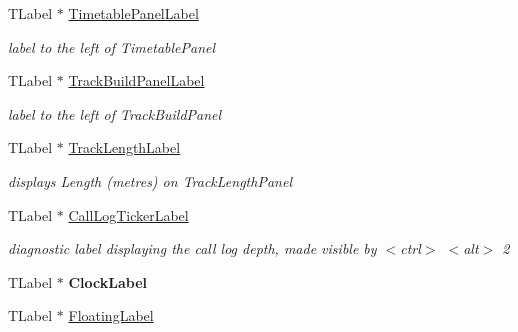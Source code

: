 \begin{DoxyCompactItemize}
\mbox{\label{class_t_interface_a321b10bd4ed20c62fa41fe6b950cb3b0}} 
T\+Label $\ast$ \mbox{\hyperlink{class_t_interface_a321b10bd4ed20c62fa41fe6b950cb3b0}{Timetable\+Panel\+Label}}
\begin{DoxyCompactList}\small\item\em label to the left of Timetable\+Panel \end{DoxyCompactList}\item 
\mbox{\label{class_t_interface_afbeb8c812aebd7b45f09b09889281a4c}} 
T\+Label $\ast$ \mbox{\hyperlink{class_t_interface_afbeb8c812aebd7b45f09b09889281a4c}{Track\+Build\+Panel\+Label}}
\begin{DoxyCompactList}\small\item\em label to the left of Track\+Build\+Panel \end{DoxyCompactList}\item 
\mbox{\label{class_t_interface_abf62cb5692bcccbba65b85dd6b192f16}} 
T\+Label $\ast$ \mbox{\hyperlink{class_t_interface_abf62cb5692bcccbba65b85dd6b192f16}{Track\+Length\+Label}}
\begin{DoxyCompactList}\small\item\em displays \textquotesingle{}Length (metres)\textquotesingle{} on Track\+Length\+Panel \end{DoxyCompactList}\item 
\mbox{\label{class_t_interface_a6c42fa668ecb3a9e4f8ddeb677781b84}} 
T\+Label $\ast$ \mbox{\hyperlink{class_t_interface_a6c42fa668ecb3a9e4f8ddeb677781b84}{Call\+Log\+Ticker\+Label}}
\begin{DoxyCompactList}\small\item\em diagnostic label displaying the call log depth, made visible by $<$ctrl$>$ $<$alt$>$ \textquotesingle{}2\textquotesingle{} \end{DoxyCompactList}\item 
\mbox{\label{class_t_interface_af06ebc1f5417120c44b3474e2eb1ea51}} 
T\+Label $\ast$ {\bfseries Clock\+Label}
\item 
\mbox{\label{class_t_interface_a1ec3d5df7eb6dbab750a63c46710e7bc}} 
T\+Label $\ast$ \mbox{\hyperlink{class_t_interface_a1ec3d5df7eb6dbab750a63c46710e7bc}{Floating\+Label}}

\end{DoxyCompactItemize}
